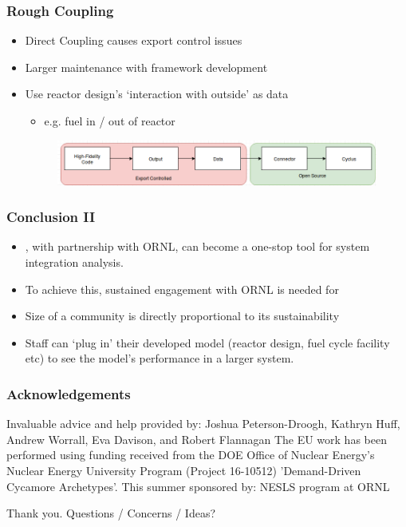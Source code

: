 \begin{frame}
	\frametitle{Rough Coupling}
	\begin{itemize}
		\item Direct Coupling causes export control issues
		\item Larger maintenance with framework development
		\item Use reactor design's `interaction with outside' as data
		\begin{itemize}
			\item e.g. fuel in / out of reactor
		\end{itemize}
		\begin{figure}[htbp!]
        \begin{center}
        \centering
                \includegraphics[width=\textwidth]{./images/con.png}
        \end{center}
    \end{figure}
	\end{itemize}
\end{frame}

\begin{frame}
	\frametitle{Conclusion II}
	\begin{itemize}
		\item \Cyclus, with partnership with ORNL, can become a one-stop tool for system integration analysis.
        \item To achieve this, sustained engagement with ORNL is needed for \Cyclus
        \item Size of a community is directly proportional to its sustainability
		\item Staff can `plug in' their developed model (reactor design, fuel cycle facility etc) to see the model's performance in a larger system.
	\end{itemize}
\end{frame}




\begin{frame}
    \frametitle{Acknowledgements}
    Invaluable advice and help provided by:
    Joshua Peterson-Droogh, Kathryn Huff, Andrew Worrall, Eva Davison, and Robert Flannagan
    \hfill \break
    \hfill \break
    The EU work has been performed using funding received from the DOE Office of Nuclear Energy's Nuclear Energy University Program (Project 16-10512) 'Demand-Driven Cycamore Archetypes'.
    \hfill \break
    \hfill \break
    This summer sponsored by:
    NESLS program at ORNL

\end{frame}

\begin{frame}
    Thank you. Questions / Concerns / Ideas?
\end{frame}